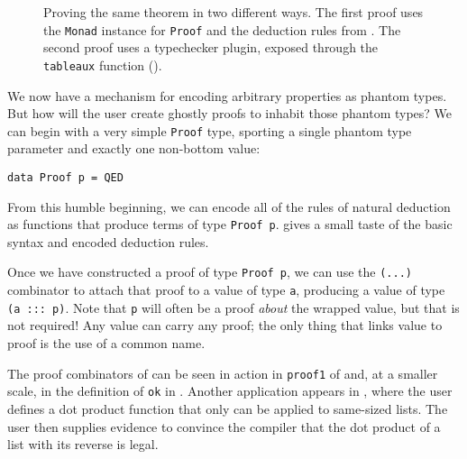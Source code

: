 \documentclass[format=sigplan, review=false, screen=true, 10pt]{acmart}
\makeatletter
\let\origsubsection\subsection
\renewcommand\subsection{\@ifstar{\starsubsection}{\nostarsubsection}}
\newcommand\nostarsubsection[1]
{\subsectionprelude\origsubsection{#1}\subsectionpostlude}
\newcommand\starsubsection[1]
{\subsectionprelude\origsubsection*{#1}\subsectionpostlude}
\newcommand\subsectionprelude{%
  \vspace{-0.25em}
}
\newcommand\subsectionpostlude{%
  \vspace{-0.05em}
}
\makeatother
\begin{document}
\subsection{Logical combinators for ghostly proofs}


\begin{figure}[b]
  \inputminted{haskell}{tableaux.hs}
  \caption{Proving the same theorem in two different ways. The first proof
    uses the \texttt{Monad} instance for
    \texttt{Proof} and the deduction rules from . The second
    proof uses a typechecker plugin, exposed through the \texttt{tableaux}
    function ().
    \label{tableaux-example}}
\end{figure}
We now have a mechanism for encoding arbitrary properties as phantom types. But how will the user
create ghostly proofs to inhabit those phantom types?
We can begin with a very simple \texttt{Proof} type,
sporting a single phantom type parameter and exactly one non-bottom value:
\begin{verbatim}
data Proof p = QED
\end{verbatim} 
From this humble beginning, we can encode all of the rules of natural deduction as functions that
produce terms of type \texttt{Proof p}.
 gives a small taste of the basic syntax and encoded deduction rules.

Once we have constructed a proof of type \texttt{Proof p}, we can use the \texttt{(...)} combinator to attach that proof to a value of type \texttt{a}, producing a value of type \verb|(a ::: p)|. Note that \texttt{p} will often be a proof \emph{about} the wrapped value,
but that is not required! Any value can carry any proof; the only thing that links value to proof is the use of a common name.

The proof combinators of  can be seen in action
in \texttt{proof1} of  and, at a smaller scale, in the
definition of \texttt{ok} in . Another application appears in , where the user defines a dot product function that only can be applied to same-sized lists.
The user then supplies evidence to convince the compiler that the dot product of a list with its reverse is legal.
\end{document}
